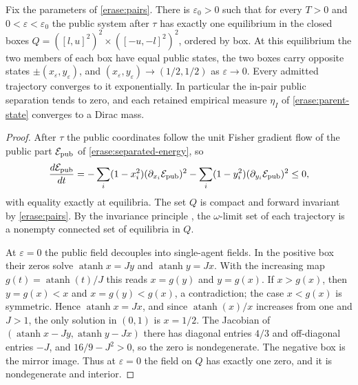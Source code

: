Fix the parameters of \cref{erase:pairs}. There is $\varepsilon_0>0$ such that for every $T>0$ and $0<\varepsilon<\varepsilon_0$ the public system after $\tau$ has exactly one equilibrium in the closed boxes $Q=([l,u]^2)^2\times([-u,-l]^2)^2$, ordered by box. At this equilibrium the two members of each box have equal public states, the two boxes carry opposite states $\pm(x_\varepsilon,y_\varepsilon)$, and $(x_\varepsilon,y_\varepsilon)\to(1/2,1/2)$ as $\varepsilon\to0$. Every admitted trajectory converges to it exponentially. In particular the in-pair public separation tends to zero, and each retained empirical measure $\eta_I$ of \cref{erase:parent-state} converges to a Dirac mass.
\begin{proof}
After $\tau$ the public coordinates follow the unit Fisher gradient flow of the public part $\mathcal E_{\rm pub}$ of \cref{erase:separated-energy}, so
\begin{equation}
 \frac{d\mathcal E_{\rm pub}}{dt}
 =-\sum_i(1-x_i^2)(\partial_{x_i}\mathcal E_{\rm pub})^2
  -\sum_i(1-y_i^2)(\partial_{y_i}\mathcal E_{\rm pub})^2\leq0,
\end{equation}
with equality exactly at equilibria. The set $Q$ is compact and forward invariant by \cref{erase:pairs}. By the invariance principle \citep{LaSalle1960}, the $\omega$-limit set of each trajectory is a nonempty connected set of equilibria in $Q$.

At $\varepsilon=0$ the public field decouples into single-agent fields. In the positive box their zeros solve $\operatorname{atanh}x=Jy$ and $\operatorname{atanh}y=Jx$. With the increasing map $g(t)=\operatorname{atanh}(t)/J$ this reads $x=g(y)$ and $y=g(x)$. If $x>g(x)$, then $y=g(x)<x$ and $x=g(y)<g(x)$, a contradiction; the case $x<g(x)$ is symmetric. Hence $\operatorname{atanh}x=Jx$, and since $\operatorname{atanh}(x)/x$ increases from one and $J>1$, the only solution in $(0,1)$ is $x=1/2$. The Jacobian of $(\operatorname{atanh}x-Jy,\operatorname{atanh}y-Jx)$ there has diagonal entries $4/3$ and off-diagonal entries $-J$, and $16/9-J^2>0$, so the zero is nondegenerate. The negative box is the mirror image. Thus at $\varepsilon=0$ the field on $Q$ has exactly one zero, and it is nondegenerate and interior.


\end{proof}
